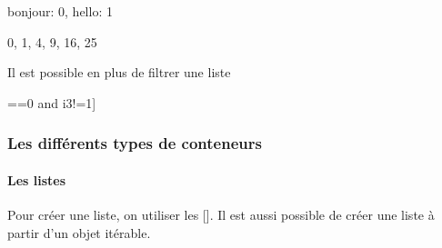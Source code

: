 \documentclass[letterpaper,10pt,english]{sphinxhowto}
\begin{document}
\begin{sphinxVerbatim}[commandchars=\\\{\}]
\PYGZob{}\PYGZsq{}bonjour\PYGZsq{}: 0, \PYGZsq{}hello\PYGZsq{}: 1\PYGZcb{}
\end{sphinxVerbatim}

\begin{sphinxVerbatim}[commandchars=\\\{\}]
\PYGZob{}0, 1, 4, 9, 16, 25\PYGZcb{}
\end{sphinxVerbatim}

\sphinxAtStartPar
Il est possible en plus de filtrer une liste

\begin{sphinxVerbatim}[commandchars=\\\{\}]
\PYG{p}{[}      ==0 and i\PYGZpc{}3!=1]
\end{sphinxVerbatim}

\begin{sphinxVerbatim}[commandchars=\\\{\}]
[0, 2, 6, 8, 12, 14, 18]
\end{sphinxVerbatim}


\subsubsection{Les différents types de conteneurs}
\label{\detokenize{cours3_conteneur_cours:les-differents-types-de-conteneurs}}

\paragraph{Les listes}
\label{\detokenize{cours3_conteneur_cours:les-listes}}
\sphinxAtStartPar
Pour créer une liste, on utiliser les {[}{]}. Il est aussi possible de créer une liste à partir d’un objet itérable.

\begin{sphinxVerbatim}[commandchars=\\\{\}]
  \PYG{p}{[} \PYG{p}{]}
  
\end{sphinxVerbatim}

\begin{sphinxVerbatim}
\end{sphinxVerbatim}
\end{document}
